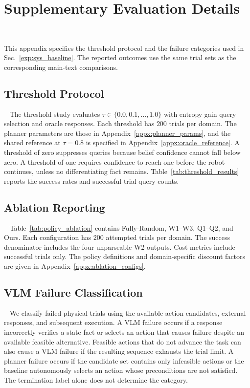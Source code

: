 \section{Supplementary Evaluation Details}~\label{appx:exp}

This appendix specifies the threshold protocol and the failure categories used in Sec.~\ref{exp:sys_baseline}. The reported outcomes use the same trial sets as the corresponding main-text comparisons.

\subsection{Threshold Protocol}~\label{appx:threshold_exp}
The threshold study evaluates $\tau\in\{0.0,0.1,\ldots,1.0\}$ with entropy gain query selection and oracle responses. Each threshold has $200$ trials per domain. The planner parameters are those in Appendix~\ref{appx:planner_params}, and the shared reference at $\tau=0.8$ is specified in Appendix~\ref{appx:oracle_reference}. A threshold of zero suppresses queries because belief confidence cannot fall below zero. A threshold of one requires confidence to reach one before the robot continues, unless no differentiating fact remains. Table~\ref{tab:threshold_results} reports the success rates and successful-trial query counts.

\subsection{Ablation Reporting}~\label{appx:policy_comparison}
Table~\ref{tab:policy_ablation} contains Fully-Random, W1--W3, Q1--Q2, and Ours. Each configuration has $200$ attempted trials per domain. The success denominator includes the four unparseable W2 outputs. Cost metrics include successful trials only. The policy definitions and domain-specific discount factors are given in Appendix~\ref{appx:ablation_configs}.

\subsection{VLM Failure Classification}~\label{appx:vlm_failure_analysis}
We classify failed physical trials using the available action candidates, external responses, and subsequent execution. A VLM failure occurs if a response incorrectly verifies a state fact or selects an action that causes failure despite an available feasible alternative. Feasible actions that do not advance the task can also cause a VLM failure if the resulting sequence exhausts the trial limit. A planner failure occurs if the candidate set contains only infeasible actions or the baseline autonomously selects an action whose preconditions are not satisfied. The termination label alone does not determine the category.


